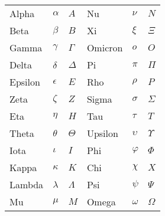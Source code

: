 \documentclass[../../../include/open-logic-chapter]{subfiles}
\begin{document}

\begin{center}
    \begin{tabular}{lll@{\qquad}lll}
    Alpha &	$\alpha$ & $A$ &
    Nu & $\nu$ & $N$ \\
    Beta & $\beta$ & $B$ &
    Xi & $\xi$ & $\Xi$ \\
    Gamma &	$\gamma$ & $\Gamma$ &
    Omicron & $o$ & $O$ \\
    Delta & $\delta$ & $\Delta$ &
    Pi & $\pi$ & $\Pi$ \\
    Epsilon & $\epsilon$ & $E$ &
    Rho & $\rho$ & $P$ \\
    Zeta & $\zeta$ & $Z$ &
    Sigma &	$\sigma$ & $\Sigma$ \\
    Eta & $\eta$ & $H$ &
    Tau & $\tau$ & $T$ \\
    Theta & $\theta$ & $\Theta$ &
    Upsilon & $\upsilon$ & $\Upsilon$ \\
    Iota & $\iota$ & $I$ &
    Phi & $\varphi$ & $\Phi$ \\
    Kappa & $\kappa$ & $K$ &
    Chi & $\chi$ & $X$ \\
    Lambda & $\lambda$ & $\Lambda$ &
    Psi & $\psi$ & $\Psi$ \\
    Mu & $\mu$ & $M$ &
    Omega & $\omega$ & $\Omega$
    \end{tabular}
\end{center}
\end{document}
